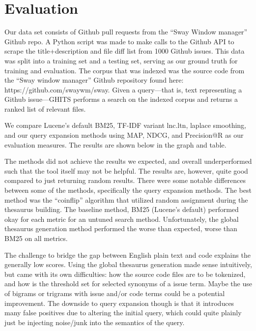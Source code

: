 \documentclass[10pt,a4paper]{article}
\begin{document}
\section{Evaluation}

Our data set consists of Github pull requests from the “Sway Window manager” Github repo. A Python script was made to make calls to the Github API to scrape the title+description and file diff list from 1000 Github issues. This data was split into a training set and a testing set, serving as our ground truth for training and evaluation. The corpus that was indexed was the source code from the “Sway window manager” Github repository found here: https://github.com/swaywm/sway. Given a query—that is, text representing a Github issue—GHITS performs a search on the indexed corpus and returns a ranked list of relevant files.

We compare Lucene’s default BM25, TF-IDF variant lnc.ltn, laplace smoothing, and our query expansion methods using MAP, NDCG, and Precision@R as our evaluation measures. The results are shown below in the graph and table. 

The methods did not achieve the results we expected, and overall underperformed such that the tool itself may not be helpful. The results are, however, quite good compared to just returning random results.  There were some notable differences between some of the methods, specifically the query expansion methods. The best method was the “coinflip” algorithm that utilized random assignment during the thesaurus building. The baseline method, BM25 (Lucene’s default) performed okay for each metric for an untuned search method. Unfortunately, the global thesaurus generation method performed the worse than expected, worse than BM25 on all metrics.

The challenge to bridge the gap between English plain text and code explains the generally low scores. Using the global thesaurus generation made sense intuitively, but came with its own difficulties: how the source code files are to be tokenized, and how is the threshold set for selected synonyms of a issue term. Maybe the use of bigrams or trigrams with issue and/or code terms could be a potential improvement. The downside to query expansion though is that it introduces many false positives due to altering the initial query, which could quite plainly just be injecting noise/junk into the semantics of the query.
\end{document}

